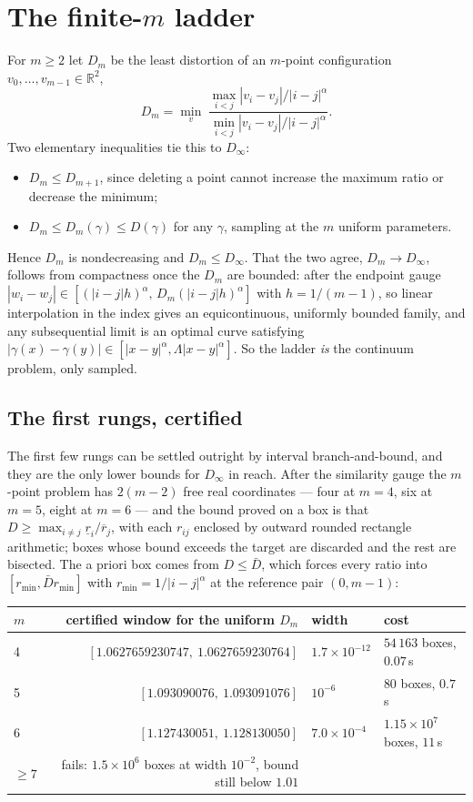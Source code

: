 \documentclass[11pt]{article}
\theoremstyle{remark}
\newcommand{\R}{\mathbb{R}}
\newcommand{\alp}{\alpha}
\begin{document}
\section{The finite-\texorpdfstring{$m$}{m} ladder}\label{sec:ladder}

For $m\ge2$ let $D_m$ be the least distortion of an $m$-point configuration
$v_0,\dots,v_{m-1}\in\R^2$,
\[
  D_m=\min_v\ \frac{\max_{i<j}|v_i-v_j|/|i-j|^{\alp}}{\min_{i<j}|v_i-v_j|/|i-j|^{\alp}} .
\]
Two elementary inequalities tie this to $D_\infty$:
\begin{itemize}
\item $D_m\le D_{m+1}$, since deleting a point cannot increase the maximum ratio or decrease the
  minimum;
\item $D_m\le D_m(\gamma)\le D(\gamma)$ for any $\gamma$, sampling at the $m$ uniform parameters.
\end{itemize}
Hence $D_m$ is nondecreasing and $D_m\le D_\infty$. That the two agree,
$D_m\to D_\infty$, follows from compactness once the $D_m$ are bounded: after the endpoint gauge
$|w_i-w_j|\in[(|i-j|h)^{\alp},\,D_m(|i-j|h)^{\alp}]$ with $h=1/(m-1)$, so linear interpolation
in the index gives an equicontinuous, uniformly bounded family, and any subsequential limit is an
optimal curve satisfying $|\gamma(x)-\gamma(y)|\in[|x-y|^{\alp},\Lambda|x-y|^{\alp}]$.
So the ladder \emph{is} the continuum problem, only sampled.


\subsection*{The first rungs, certified}\label{sec:m4}

The first few rungs can be settled outright by interval branch-and-bound, and they are the only
lower bounds for $D_\infty$ in reach. After the similarity gauge the $m$-point problem has $2(m-2)$
free real coordinates --- four at $m=4$, six at $m=5$, eight at $m=6$ --- and the bound proved on a
box is that $D\ge\max_{i\ne j}\underline r_i/\overline r_j$, with each $r_{ij}$ enclosed by outward
rounded rectangle arithmetic; boxes whose bound exceeds the target are discarded and the rest are
bisected. The a priori box comes from $D\le\bar D$, which forces every ratio into
$[r_{\min},\bar D r_{\min}]$ with $r_{\min}=1/|i-j|^{\alp}$ at the reference pair $(0,m-1)$:

\begin{table}[h]
\centering
\small
\begin{tabular}{lrll}
\toprule
$m$ & certified window for the uniform $D_m$ & width & cost \\
\midrule
4 & $[1.0627659230747,\ 1.0627659230764]$ & $1.7\times10^{-12}$ & $54\,163$ boxes, $0.07$\,s \\
5 & $[1.093090076,\ 1.093091076]$         & $10^{-6}$           & $80$ boxes, $0.7$\,s \\
6 & $[1.127430051,\ 1.128130050]$         & $7.0\times10^{-4}$  & $1.15\times10^{7}$ boxes, $11$\,s \\
$\ge7$ & fails: $1.5\times10^{6}$ boxes at width $10^{-2}$, bound still below $1.01$ & & \\
\bottomrule
\end{tabular}
\end{table}
\end{document}
